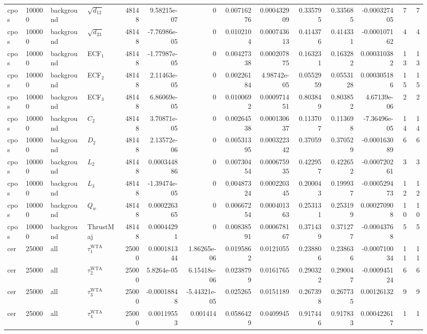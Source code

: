 \begin{landscape}
\begin{longtable}{llll r rrrr rr r rr}
cpos & 100000 & background & $\sqrt{d_{12}}$ & 48148 & 9.58215e-07 & 0 & 0.00716276 & 0.000432909 & 0.335795 & 0.335685 & -0.000327405 & 7 & 7 \\
cpos & 100000 & background & $\sqrt{d_{23}}$ & 48148 & -7.76986e-05 & 0 & 0.0102104 & 0.000743613 & 0.414376 & 0.414331 & -0.000107162 & 4 & 4 \\
cpos & 100000 & background & ECF$_1$ & 48148 & -1.77987e-05 & 0 & 0.00427338 & 0.000207875 & 0.163231 & 0.163282 & 0.000310382 & 13 & 13 \\
cpos & 100000 & background & ECF$_2$ & 48148 & 2.11463e-05 & 0 & 0.00226184 & 4.98742e-05 & 0.0552959 & 0.0553128 & 0.000305186 & 15 & 15 \\
cpos & 100000 & background & ECF$_3$ & 48148 & 6.86069e-05 & 0 & 0.0100692 & 0.000971451 & 0.803849 & 0.803852 & 4.67139e-06 & 2 & 2 \\
cpos & 100000 & background & $C_2$ & 48148 & 3.70871e-05 & 0 & 0.00264538 & 0.000130637 & 0.113707 & 0.113698 & -7.36496e-05 & 14 & 14 \\
cpos & 100000 & background & $D_2$ & 48148 & 2.13572e-06 & 0 & 0.00531395 & 0.000322342 & 0.37059 & 0.370529 & -0.000163089 & 6 & 6 \\
cpos & 100000 & background & $L_2$ & 48148 & 0.000344886 & 0 & 0.00730454 & 0.000675935 & 0.422957 & 0.422652 & -0.000720261 & 3 & 3 \\
cpos & 100000 & background & $L_3$ & 48148 & -1.39474e-05 & 0 & 0.00487324 & 0.000220345 & 0.200043 & 0.199937 & -0.000529473 & 12 & 12 \\
cpos & 100000 & background & $Q_w$ & 48148 & 0.000226365 & 0 & 0.00667254 & 0.000401363 & 0.253131 & 0.253199 & 0.000270908 & 10 & 10 \\
cpos & 100000 & background & ThrustMaj & 48148 & 0.00044291 & 0 & 0.00838591 & 0.000678167 & 0.371439 & 0.371277 & -0.00043768 & 5 & 5 \\
cer & 25000 & all & $\tau_1^{\mathrm{WTA}}$ & 25000 & 0.000181344 & 1.86265e-06 & 0.0195862 & 0.0121055 & 0.238806 & 0.238636 & -0.000710034 & 11 & 11 \\
cer & 25000 & all & $\tau_2^{\mathrm{WTA}}$ & 25000 & 5.8264e-05 & 6.15418e-06 & 0.0238799 & 0.0161765 & 0.290322 & 0.290047 & -0.000945124 & 6 & 6 \\
cer & 25000 & all & $\tau_3^{\mathrm{WTA}}$ & 25000 & -0.00018848 & -5.44321e-05 & 0.025265 & 0.0151189 & 0.267398 & 0.267735 & 0.00126132 & 9 & 9 \\
cer & 25000 & all & $\tau_4^{\mathrm{WTA}}$ & 25000 & 0.00119553 & 0.001414 & 0.0586429 & 0.0409945 & 0.917446 & 0.917833 & 0.000422617 & 1 & 1 \\

\end{longtable}
\end{landscape}
